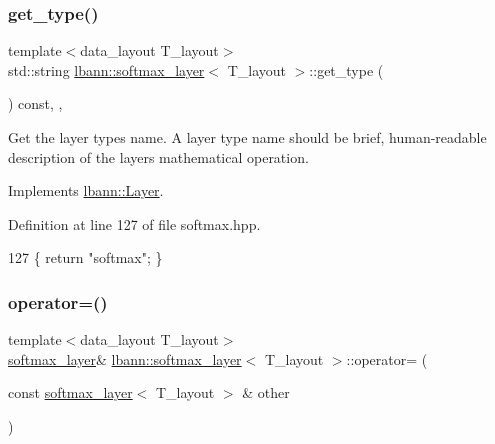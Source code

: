 \subsubsection{\texorpdfstring{get\+\_\+type()}{get\_type()}}
{\footnotesize\ttfamily template$<$data\+\_\+layout T\+\_\+layout$>$ \\
std\+::string \hyperlink{classlbann_1_1softmax__layer}{lbann\+::softmax\+\_\+layer}$<$ T\+\_\+layout $>$\+::get\+\_\+type (\begin{DoxyParamCaption}{ }\end{DoxyParamCaption}) const\hspace{0.3cm}{\ttfamily [inline]}, {\ttfamily [override]}, {\ttfamily [virtual]}}

Get the layer type\textquotesingle{}s name. A layer type name should be brief, human-\/readable description of the layer\textquotesingle{}s mathematical operation. 

Implements \hyperlink{classlbann_1_1Layer_a0fa0ea9160b490c151c0a17fde4f7239}{lbann\+::\+Layer}.



Definition at line 127 of file softmax.\+hpp.


\begin{DoxyCode}
127 \{ \textcolor{keywordflow}{return} \textcolor{stringliteral}{"softmax"}; \}
\end{DoxyCode}
\mbox{\label{classlbann_1_1softmax__layer_a8532a4e2b1669840cea80cfde383bebb}} 
\subsubsection{\texorpdfstring{operator=()}{operator=()}}
{\footnotesize\ttfamily template$<$data\+\_\+layout T\+\_\+layout$>$ \\
\hyperlink{classlbann_1_1softmax__layer}{softmax\+\_\+layer}\& \hyperlink{classlbann_1_1softmax__layer}{lbann\+::softmax\+\_\+layer}$<$ T\+\_\+layout $>$\+::operator= (\begin{DoxyParamCaption}\item[{const \hyperlink{classlbann_1_1softmax__layer}{softmax\+\_\+layer}$<$ T\+\_\+layout $>$ \&}]{other }\end{DoxyParamCaption})\hspace{0.3cm}{\ttfamily [inline]}}



